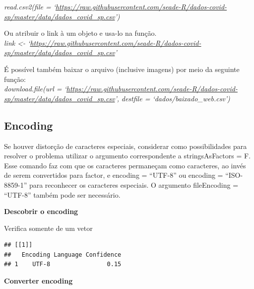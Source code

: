 \documentclass[
]{book}
\newenvironment{Shaded}{\begin{snugshade}}{\end{snugshade}}
\newcommand{\AttributeTok}[1]{\textcolor[rgb]{0.77,0.63,0.00}{#1}}
\newcommand{\CommentTok}[1]{\textcolor[rgb]{0.56,0.35,0.01}{\textit{#1}}}
\newcommand{\DecValTok}[1]{\textcolor[rgb]{0.00,0.00,0.81}{#1}}
\newcommand{\FunctionTok}[1]{\textcolor[rgb]{0.00,0.00,0.00}{#1}}
\newcommand{\NormalTok}[1]{#1}
\newcommand{\SpecialCharTok}[1]{\textcolor[rgb]{0.00,0.00,0.00}{#1}}
\newcommand{\StringTok}[1]{\textcolor[rgb]{0.31,0.60,0.02}{#1}}
\theoremstyle{definition}
\theoremstyle{definition}
\theoremstyle{definition}
\theoremstyle{definition}
\theoremstyle{remark}
\begin{document}
\emph{read.csv2(file = `\url{https://raw.githubusercontent.com/seade-R/dados-covid-sp/master/data/dados_covid_sp.csv}')}

Ou atribuir o link à um objeto e usa-lo na função.\\
\emph{link \textless- `\url{https://raw.githubusercontent.com/seade-R/dados-covid-sp/master/data/dados_covid_sp.csv}'}

É possível também baixar o arquivo (inclusive imagens) por meio da seguinte função:\\
\emph{download.file(url = `\url{https://raw.githubusercontent.com/seade-R/dados-covid-sp/master/data/dados_covid_sp.csv}',}
\emph{destfile = `dados/baixado\_web.csv')}

\hypertarget{encoding}{%
\subsection{Encoding}\label{encoding}}

Se houver distorção de caracteres especiais, considerar como possibilidades para resolver o problema utilizar o argumento correspondente a stringsAsFactors = F. Esse comando faz com que os caracteres permaneçam como caracteres, ao invés de serem convertidos para factor, e encoding = ``UTF-8'' ou encoding = ``ISO-8859-1'' para reconhecer os caracteres especiais. O argumento fileEncoding = ``UTF-8'' também pode ser necessário.

\textbf{Descobrir o encoding}

Verifica somente de um vetor

\begin{Shaded}
\end{Shaded}

\begin{verbatim}
## [[1]]
##   Encoding Language Confidence
## 1    UTF-8                0.15
\end{verbatim}

\textbf{Converter encoding}

\begin{Shaded}
\end{Shaded}
\end{document}
